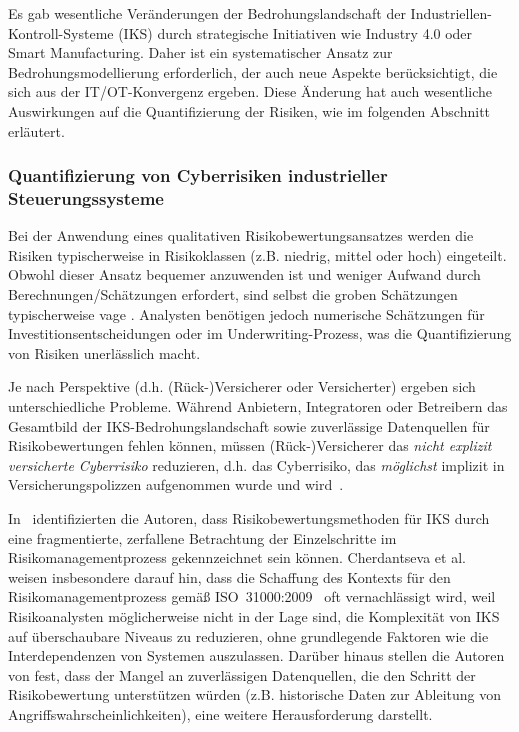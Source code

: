 \documentclass[11pt]{scrartcl}
\begin{document}
Es gab wesentliche Veränderungen der Bedrohungslandschaft der Industriellen-Kontroll-Systeme (IKS) durch strategische Initiativen wie Industry 4.0 oder Smart Manufacturing. Daher ist ein systematischer Ansatz zur Bedrohungsmodellierung erforderlich, der auch neue Aspekte berücksichtigt, die sich aus der IT/OT-Konvergenz ergeben. Diese Änderung hat auch wesentliche Auswirkungen auf die Quantifizierung der Risiken, wie im folgenden Abschnitt erläutert.

\subsubsection{Quantifizierung von Cyberrisiken industrieller Steuerungssysteme}

Bei der Anwendung eines qualitativen Risikobewertungsansatzes werden die Risiken typischerweise in Risikoklassen (z.B. niedrig, mittel oder hoch) eingeteilt. Obwohl dieser Ansatz bequemer anzuwenden ist und weniger Aufwand durch Berechnungen/Schätzungen erfordert, sind selbst die groben Schätzungen typischerweise vage \cite{Bojanc2008}. Analysten benötigen jedoch numerische Schätzungen für Investitionsentscheidungen oder im Underwriting-Prozess, was die Quantifizierung von Risiken unerlässlich macht.

Je nach Perspektive (d.h. (Rück-)Versicherer oder Versicherter) ergeben sich unterschiedliche Probleme. Während Anbietern, Integratoren oder Betreibern das Gesamtbild der IKS-Bedrohungslandschaft sowie zuverlässige Datenquellen für Risikobewertungen fehlen können, müssen (Rück-)Versicherer das \emph{nicht explizit versicherte Cyberrisiko} reduzieren, d.h. das Cyberrisiko, das \emph{möglichst} implizit in Versicherungspolizzen aufgenommen wurde und wird~\cite{PRA2017}.


In~\cite{Cherdantseva2016} identifizierten die Autoren, dass Risikobewertungsmethoden für IKS durch eine fragmentierte, zerfallene Betrachtung der Einzelschritte im Risikomanagementprozess gekennzeichnet sein können. Cherdantseva et al.~\cite{Cherdantseva2016} weisen insbesondere darauf hin, dass die Schaffung des Kontexts für den Risikomanagementprozess gemäß ISO~31000:2009~\cite{ISO2009} oft vernachlässigt wird, weil Risikoanalysten möglicherweise nicht in der Lage sind, die Komplexität von IKS auf überschaubare Niveaus zu reduzieren, ohne grundlegende Faktoren wie die Interdependenzen von Systemen auszulassen. Darüber hinaus stellen die Autoren von \cite{Cherdantseva2016} fest, dass der Mangel an zuverlässigen Datenquellen, die den Schritt der Risikobewertung unterstützen würden (z.B. historische Daten zur Ableitung von Angriffswahrscheinlichkeiten), eine weitere Herausforderung darstellt.
\end{document}
